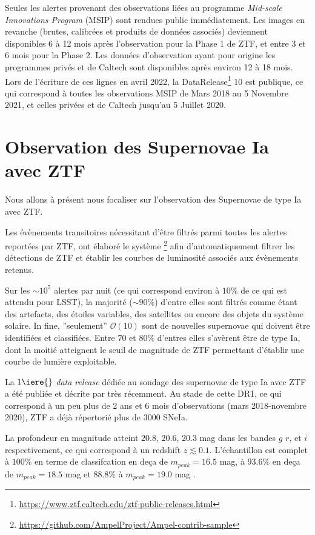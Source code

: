 \documentclass[../main/main.tex]{subfiles}
\begin{document}
Seules les alertes provenant des observations liées au programme \textit{Mid-scale
Innovations Program} (MSIP)
sont rendues public immédiatement. Les images en revanche (brutes,
calibrées et produits de données associés) deviennent disponibles 6 à 12 mois 
après l'observation pour la Phase 1 de ZTF, et entre 3 et 6 mois pour la
Phase 2. Les données d'observation ayant pour origine les programmes
privés et de Caltech sont disponibles après environ 12 à 18 mois. Lors
de l'écriture de ces lignes en avril 2022, la
DataRelease\footnote{\url{https://www.ztf.caltech.edu/ztf-public-releases.html}}
10 est publique, ce qui correspond à toutes les observations MSIP de Mars 2018 au 5 Novembre
2021, et celles privées et de Caltech jusqu'au 5 Juillet 2020.

\section{Observation des Supernovae Ia avec ZTF}\label{sec:sniaztf}

Nous allons à présent nous focaliser sur l'observation des Supernovae de
type Ia avec ZTF.

Les évènements transitoires nécessitant d'être filtrés parmi toutes les
alertes reportées par ZTF, \citet{NordinAMPEL2019} ont élaboré le système
\footnote{\url{https://github.com/AmpelProject/Ampel-contrib-sample}} afin d'automatiquement filtrer
les détections de ZTF et établir les courbes de luminosité associés aux
évènements retenus.

Sur les $\sim 10^{5}$ alertes par nuit (ce qui correspond environ à
$10\%$ de ce qui est attendu pour LSST), la majorité ($\sim 90\%$)
d'entre elles sont filtrés comme étant des artefacts, des étoiles
variables, des satellites ou encore des objets du système solaire. In
fine, ''seulement'' $\mathcal{O}(10)$ sont de nouvelles supernovae qui
doivent être identifiées et classifiées. Entre $70$ et $80\%$ d'entres
elles s'avèrent être de type Ia, dont la moitié atteignent le seuil de
magnitude de ZTF permettant d'établir une courbe de lumière
exploitable.

La $1\iere{}$ \textit{data release} dédiée au sondage des supernovae de type Ia
avec ZTF a été publiée et décrite par \citet{DhawanZTFDR1} très
récemment. Au stade de cette DR1, ce qui correspond à un peu plus de 2
ans et 6 mois d'observations (mars 2018-novembre 2020), ZTF a déjà
répertorié plus de $3000$ SNeIa.

La profondeur en magnitude atteint
$20.8$, $20.6$, $20.3$ mag dans les bandes $g$ $r$, et $i$ respectivement, ce qui
correspond à un redshift $z\lesssim0.1$. L'échantillon est complet à
$100\%$ en terme de classifcation en deça de $m_{peak}=16.5$ mag, à
$93.6\%$ en deça de $m_{peak}=18.5$ mag et $88.8\%$ à $m_{peak}=19.0$
mag \citep{FremlingZTFspec2020}.
\end{document}
